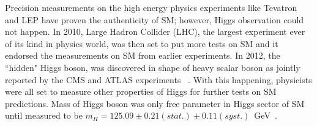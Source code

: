 Precision measurements on the high energy physics experiments like Tevatron and LEP have proven the authenticity of SM; however, Higgs observation could not happen. 
In 2010, Large Hadron Collider (LHC), the largest experiment ever of its kind in physics world, was then set to put more tests on SM and it endorsed the measurements on SM from earlier experiments. In 2012, the ``hidden" Higgs boson, was discovered in shape of heavy scalar boson as jointly reported by the CMS and ATLAS experiments ~\cite{Reference20,Reference21}. With this happening, physicists were all set to measure other properties of Higgs for further tests on SM predictions. 
Mass of Higgs boson was only free parameter in Higgs sector of SM until measured to be $m_H = 125.09\pm 0.21(stat.)\pm0.11(syst.)$~GeV~\cite{Reference22}.

